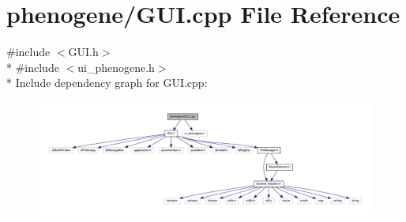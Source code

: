 \hypertarget{a00009}{\section{phenogene/\-G\-U\-I.cpp File Reference}
\label{da/da0/a00009}
}
{\ttfamily \#include $<$G\-U\-I.\-h$>$}\\*
{\ttfamily \#include $<$ui\-\_\-phenogene.\-h$>$}\\*
Include dependency graph for G\-U\-I.\-cpp\-:\nopagebreak
\begin{figure}[H]
\begin{center}
\leavevmode
\includegraphics[width=350pt]{d5/d16/a00029}
\end{center}
\end{figure}

